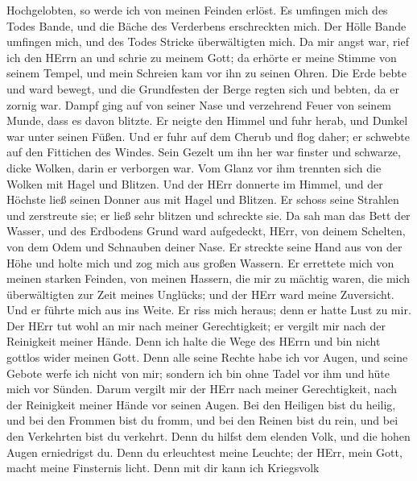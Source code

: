Hochgelobten, so werde ich von meinen Feinden erlöst.  Es
umfingen mich des Todes Bande, und die Bäche des Verderbens erschreckten
mich.  Der Hölle Bande umfingen mich, und des Todes Stricke
überwältigten mich.  Da mir angst war, rief ich den HErrn an
und schrie zu meinem Gott; da erhörte er meine Stimme von seinem Tempel,
und mein Schreien kam vor ihn zu seinen Ohren.  Die Erde
bebte und ward bewegt, und die Grundfesten der Berge regten sich und
bebten, da er zornig war.  Dampf ging auf von seiner Nase
und verzehrend Feuer von seinem Munde, dass es davon blitzte.
 Er neigte den Himmel und fuhr herab, und Dunkel war unter
seinen Füßen.  Und er fuhr auf dem Cherub und flog daher;
er schwebte auf den Fittichen des Windes.  Sein Gezelt um
ihn her war finster und schwarze, dicke Wolken, darin er verborgen war.
 Vom Glanz vor ihm trennten sich die Wolken mit Hagel und
Blitzen.  Und der HErr donnerte im Himmel, und der Höchste
ließ seinen Donner aus mit Hagel und Blitzen.  Er schoss
seine Strahlen und zerstreute sie; er ließ sehr blitzen und schreckte
sie.  Da sah man das Bett der Wasser, und des Erdbodens
Grund ward aufgedeckt, HErr, von deinem Schelten, von dem Odem und
Schnauben deiner Nase.  Er streckte seine Hand aus von der
Höhe und holte mich und zog mich aus großen Wassern.  Er
errettete mich von meinen starken Feinden, von meinen Hassern, die mir
zu mächtig waren,  die mich überwältigten zur Zeit meines
Unglücks; und der HErr ward meine Zuversicht.  Und er
führte mich aus ins Weite. Er riss mich heraus; denn er hatte Lust zu
mir.  Der HErr tut wohl an mir nach meiner Gerechtigkeit;
er vergilt mir nach der Reinigkeit meiner Hände.  Denn ich
halte die Wege des HErrn und bin nicht gottlos wider meinen Gott.
 Denn alle seine Rechte habe ich vor Augen, und seine
Gebote werfe ich nicht von mir;  sondern ich bin ohne Tadel
vor ihm und hüte mich vor Sünden.  Darum vergilt mir der
HErr nach meiner Gerechtigkeit, nach der Reinigkeit meiner Hände vor
seinen Augen.  Bei den Heiligen bist du heilig, und bei den
Frommen bist du fromm,  und bei den Reinen bist du rein,
und bei den Verkehrten bist du verkehrt.  Denn du hilfst
dem elenden Volk, und die hohen Augen erniedrigst du.  Denn
du erleuchtest meine Leuchte; der HErr, mein Gott, macht meine
Finsternis licht.  Denn mit dir kann ich Kriegsvolk
